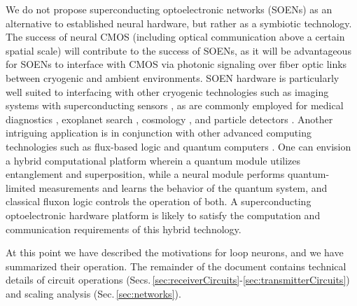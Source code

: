 \documentclass[twocolumn]{article}
\begin{document}
We do not propose superconducting optoelectronic networks (SOENs) as an alternative to established neural hardware, but rather as a symbiotic technology. The success of neural CMOS (including optical communication above a certain spatial scale) will contribute to the success of SOENs, as it will be advantageous for SOENs to interface with CMOS via photonic signaling over fiber optic links between cryogenic and ambient environments. SOEN hardware is particularly well suited to interfacing with other cryogenic technologies such as imaging systems with superconducting sensors  \cite{alve2015,chsc2017}, as are commonly employed for medical diagnostics \cite{hada2016}, exoplanet search \cite{raca2016,boga1992,kila2016}, cosmology \cite{diad2017}, and particle detectors \cite{le2017}. Another intriguing application is in conjunction with other advanced computing technologies such as flux-based logic \cite{li2012,taoz2013,hehe2011} and quantum computers \cite{nich2000,blga2007,Zwanenburg2013,Hill,we2017}. One can envision a hybrid computational platform \cite{deli2017,posc2017} wherein a quantum module utilizes entanglement and superposition, while a neural module performs quantum-limited measurements and learns the behavior of the quantum system, and classical fluxon logic controls the operation of both. A superconducting optoelectronic hardware platform is likely to satisfy the computation and communication requirements of this hybrid technology. 

At this point we have described the motivations for loop neurons, and we have summarized their operation. The remainder of the document contains technical details of circuit operations (Secs.\,\ref{sec:receiverCircuits}-\ref{sec:transmitterCircuits}) and scaling analysis (Sec.\,\ref{sec:networks}).

\end{document}
